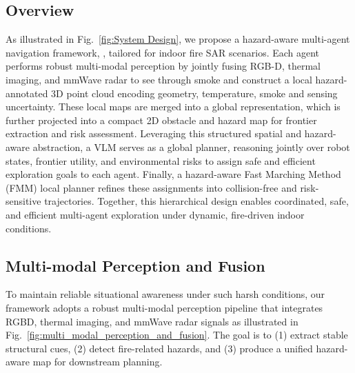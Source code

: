 \subsection{Overview}
As illustrated in Fig.~\ref{fig:System Design}, we propose a hazard-aware multi-agent navigation framework, \system, tailored for indoor fire SAR scenarios. Each agent performs robust multi-modal perception by jointly fusing RGB-D, thermal imaging, and mmWave radar to see through smoke and construct a local hazard-annotated 3D point cloud encoding geometry, temperature, smoke and sensing uncertainty. These local maps are merged into a global representation, which is further projected into a compact 2D obstacle and hazard map for frontier extraction and risk assessment. Leveraging this structured spatial and hazard-aware abstraction, a VLM serves as a global planner, reasoning jointly over robot states, frontier utility, and environmental risks to assign safe and efficient exploration goals to each agent. Finally, a hazard-aware Fast Marching Method (FMM) local planner refines these assignments into collision-free and risk-sensitive trajectories. Together, this hierarchical design enables coordinated, safe, and efficient multi-agent exploration under dynamic, fire-driven indoor conditions.

\subsection{Multi-modal Perception and Fusion}
To maintain reliable situational awareness under such harsh conditions, our framework adopts a robust multi-modal perception pipeline that integrates RGBD, thermal imaging, and mmWave radar signals as illustrated in Fig.~\ref{fig:multi_modal_perception_and_fusion}. The goal is to (1) extract stable structural cues, (2) detect fire-related hazards, and (3) produce a unified hazard-aware map for downstream planning.

